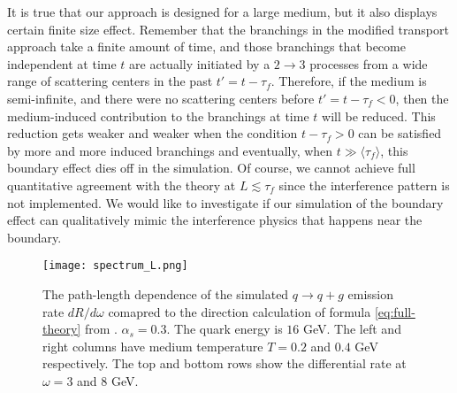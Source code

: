 It is true that our approach is designed for a large medium, but it also displays certain finite size effect. 
Remember that the branchings in the modified transport approach take a finite amount of time, and those branchings that become independent at time $t$ are actually initiated by a $2\rightarrow 3$ processes from a wide range of scattering centers in the past $t' = t - \tau_f$.
Therefore, if the medium is semi-infinite, and there were no scattering centers before $t' = t-\tau_f < 0$, then the medium-induced contribution to the branchings at time $t$ will be reduced.
This reduction gets weaker and weaker when the condition $t-\tau_f > 0$ can be satisfied by more and more induced branchings and eventually, when $t\gg \langle \tau_f\rangle$, this boundary effect dies off in the simulation. 
Of course, we cannot achieve full quantitative agreement with the theory at $L \lesssim \tau_f$ since the interference pattern is not implemented.
We would like to investigate if our simulation of the boundary effect can qualitatively mimic the interference physics that happens near the boundary.

\begin{figure}
\singlespacing
\centering
\texttt{[image: spectrum\_L.png]}
\caption[The path-length dependence of the simulated $q\rightarrow q+g$]{The path-length dependence of the simulated $q\rightarrow q+g$ emission rate $dR/d\omega$ comapred to the direction calculation of formula \ref{eq:full-theory} from \cite{CaronHuot:2010bp}. $\alpha_s = 0.3$. The quark energy is $16$ GeV. The left and right columns have medium temperature $T=0.2$ and $0.4$ GeV respectively. The top and bottom rows show the differential rate at $\omega = 3$ and $8$ GeV.}
\label{fig:spectra-L-alphas=0.3}
\end{figure}

